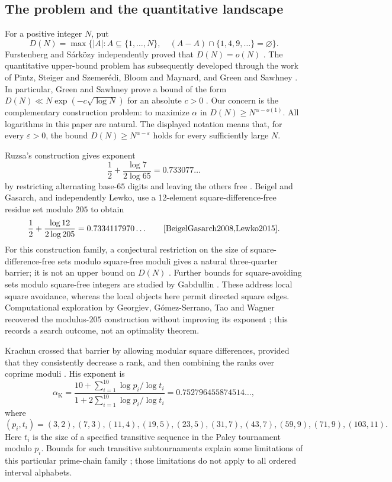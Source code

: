 \documentclass[11pt]{article}
\theoremstyle{definition}
\theoremstyle{remark}
\newcommand{\card}[1]{\lvert #1\rvert}
\begin{document}
\subsection{The problem and the quantitative landscape}
For a positive integer $N$, put
\[
 D(N)=\max\bigl\{\card A:A\subseteq\{1,\ldots,N\},\quad
 (A-A)\cap\{1,4,9,\ldots\}=\varnothing\bigr\}.
\]
Furstenberg and S\'ark\"ozy independently proved that $D(N)=o(N)$
\cite{Furstenberg1977,Sarkozy1978}. The quantitative upper-bound problem has
subsequently developed through the work of Pintz, Steiger and Szemer\'edi,
Bloom and Maynard, and Green and Sawhney
\cite{PintzSteigerSzemeredi1988,BloomMaynard2022,GreenSawhney2025}.
In particular, Green and Sawhney prove a bound of the form
$D(N)\ll N\exp(-c\sqrt{\log N})$ for an absolute $c>0$
\cite[Theorem 1.1]{GreenSawhney2025}.
Our concern is the complementary construction problem: to maximize $\alpha$
in $D(N)\ge N^{\alpha-o(1)}$. All logarithms in this paper are natural.
The displayed notation means that, for every $\varepsilon>0$, the bound
$D(N)\ge N^{\alpha-\varepsilon}$ holds for every sufficiently large $N$.

Ruzsa's construction gives exponent
\[
 \frac12+\frac{\log7}{2\log65}=0.733077\ldots
\]
by restricting alternating base-$65$ digits and leaving the others free
\cite{Ruzsa1984}. Beigel and Gasarch, and independently Lewko, use a
12-element square-difference-free residue set modulo $205$ to obtain
\[
 \frac12+\frac{\log12}{2\log205}=0.7334117970\ldots
 \qquad\cite{BeigelGasarch2008,Lewko2015}.
\]
For this construction family, a conjectural restriction on the size of
square-difference-free sets modulo square-free moduli gives a natural
three-quarter barrier; it is not an upper bound on $D(N)$
\cite{Ruzsa1984,Lewko2015}.
Further bounds for square-avoiding sets modulo square-free integers are
studied by Gabdullin \cite{Gabdullin2018}. These address local square
avoidance, whereas the local objects here permit directed square edges.
Computational exploration by Georgiev, G\'omez-Serrano, Tao and Wagner
recovered the modulus-$205$ construction without improving its exponent
\cite[Section 16]{GeorgievEtAl2025}; this records a search outcome, not
an optimality theorem.

Krachun crossed that barrier by allowing modular square differences, provided
that they consistently decrease a rank, and then combining the ranks over
coprime moduli \cite{Krachun2026}. His exponent is
\begin{equation}\label{eq:krachun}
 \alpha_{\mathrm K}=
 \frac{10+\sum_{i=1}^{10}\log p_i/\log t_i}
      {1+2\sum_{i=1}^{10}\log p_i/\log t_i}
 =0.752796455874514\ldots,
\end{equation}
where
\[
 (p_i,t_i)=(3,2),(7,3),(11,4),(19,5),(23,5),
 (31,7),(43,7),(59,9),(71,9),(103,11).
\]
Here $t_i$ is the size of a specified transitive sequence in the Paley
tournament modulo $p_i$. Bounds for such transitive subtournaments explain
some limitations of this particular prime-chain family
\cite{Satake2021,Krachun2026}; those limitations do not apply to all ordered
interval alphabets.
\end{document}
